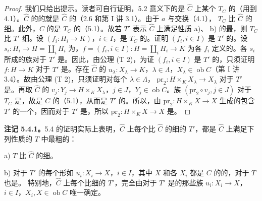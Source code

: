\begin{proof}
我们只给出提示。读者可自行证明，5.2 意义下的是 $\widehat C$ 上某个 $T_C$ 的（用到 4.1）。$\widehat C$ 的的就是 $\widehat C$ 的（2.6 和第 I 讲 3.1）。由于 $a$ 与交换（4.1）， $T_C$ 比 $\widehat C$ 的细。此外，$C$ 的是 $T_C$ 的（5.1）。故若 $T'$ 表示 $\widehat C$ 上满足性质 a)、
b) 的最，则 $T_C$ 比 $T'$ 细。设 $(f_i:H_i\to K)$，$i\in I$，是 $T_C$ 的。证明 $(f_i,i\in I)$ 是 $T'$ 的。设 $s_i:H_i\to H=\coprod_iH_i$ 为，$f=(f_i,i\in I):H=\coprod_iH_i\to K$ 为各 $f_i$ 定义的。各 $s_i$ 所成的族对于 $T'$ 是。因此，由公理 (T 2)，为证 $(f_i,i\in I)$ 是 $T'$ 的，只须证明 $f:H\to K$ 对于 $T'$ 是。存在 $\widehat C$ 的 $u_\lambda:X_\lambda\to K$，$\lambda\in\Lambda$，$X_\lambda\in\operatorname{ob}C$（第 I 讲 3.4）。故由公理 (T 2)，只须证明对每个 $\lambda\in\Lambda$， $\mathrm{pr}_2:H\times_KX_\lambda\to X_\lambda$ 对于 $T'$ 是。再取 $\widehat C$ 的 $v_j:Y_j\to H\times_KX_\lambda$，$j\in J$，$Y_j\in\operatorname{ob}C$。族 $(\mathrm{pr}_2\circ v_j,j\in J)$ 对于 $T_C$ 是，故是 $C$ 的（5.1），从而是 $T'$ 的。所以，由 $\mathrm{pr}_2:H\times_KX\to X$ 生成的包含 $T'$ 的一个，因而对于 $T'$ 是，所以 $\mathrm{pr}_2:H\times_KX\to X$ 是。
\end{proof}
\textbf{注记 5.4.1。}5.4 的证明实际上表明，$\widehat C$ 上每个比 $\widehat C$ 的细的 $T'$，都是 $\widehat C$ 上满足下列性质的 $T$ 中最粗的：
\par a) $T$ 比 $\widehat C$ 的细。
\par b) 对于 $T'$ 的每个形如 $u_i:X_i\to X$，$i\in I$，其中 $X$ 和各 $X_i$ 都是 $C$ 的的，对于 $T$ 也是。
特别地，$\widehat C$ 上每个比细的 $T'$，完全由对于 $T'$ 是的那些族 $u_i:X_i\to X$，$i\in I$，$X_i,X\in\operatorname{ob}C$ 唯一确定。

